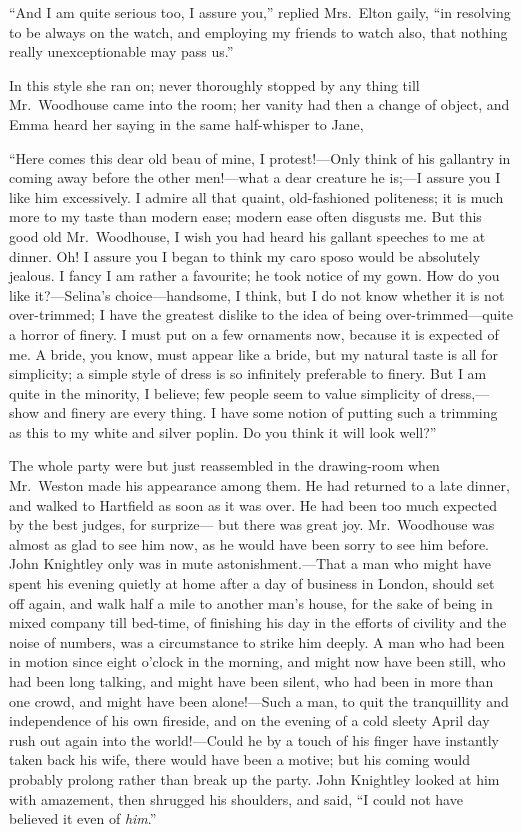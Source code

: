 ``And I am quite serious too, I assure you,'' replied Mrs.\ Elton gaily,
``in resolving to be always on the watch, and employing my friends
to watch also, that nothing really unexceptionable may pass us.''

In this style she ran on; never thoroughly stopped by any thing
till Mr.\ Woodhouse came into the room; her vanity had then a change
of object, and Emma heard her saying in the same half-whisper to Jane,

``Here comes this dear old beau of mine, I protest!---Only think of his
gallantry in coming away before the other men!---what a dear creature
he is;---I assure you I like him excessively.  I admire all that quaint,
old-fashioned politeness; it is much more to my taste than modern ease;
modern ease often disgusts me.  But this good old Mr.\ Woodhouse,
I wish you had heard his gallant speeches to me at dinner.  Oh!  I assure
you I began to think my caro sposo would be absolutely jealous.
I fancy I am rather a favourite; he took notice of my gown.
How do you like it?---Selina's choice---handsome, I think, but I
do not know whether it is not over-trimmed; I have the greatest
dislike to the idea of being over-trimmed---quite a horror of finery.
I must put on a few ornaments now, because it is expected of me.
A bride, you know, must appear like a bride, but my natural taste
is all for simplicity; a simple style of dress is so infinitely
preferable to finery.  But I am quite in the minority, I believe;
few people seem to value simplicity of dress,---show and finery
are every thing.  I have some notion of putting such a trimming
as this to my white and silver poplin.  Do you think it will
look well?''

The whole party were but just reassembled in the drawing-room
when Mr.\ Weston made his appearance among them.  He had returned
to a late dinner, and walked to Hartfield as soon as it was over.
He had been too much expected by the best judges, for surprize---%
but there was great joy.  Mr.\ Woodhouse was almost as glad to see
him now, as he would have been sorry to see him before.  John Knightley
only was in mute astonishment.---That a man who might have spent
his evening quietly at home after a day of business in London,
should set off again, and walk half a mile to another man's house,
for the sake of being in mixed company till bed-time, of finishing
his day in the efforts of civility and the noise of numbers,
was a circumstance to strike him deeply.  A man who had been in motion
since eight o'clock in the morning, and might now have been still,
who had been long talking, and might have been silent, who had been
in more than one crowd, and might have been alone!---Such a man,
to quit the tranquillity and independence of his own fireside,
and on the evening of a cold sleety April day rush out again into
the world!---Could he by a touch of his finger have instantly taken
back his wife, there would have been a motive; but his coming would
probably prolong rather than break up the party.  John Knightley
looked at him with amazement, then shrugged his shoulders, and said,
``I could not have believed it even of \emph{him}.''


